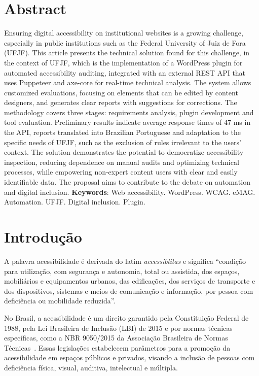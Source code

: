 \documentclass[
    12pt,
    a4paper,
    oneside,
    brazil,
    english
]{article}
\begin{document}
\section*{Abstract}
Ensuring digital accessibility on institutional websites is a growing challenge, especially
in public institutions such as the Federal University of Juiz de Fora (UFJF). This article
presents the technical solution found for this challenge, in the context of UFJF, which is the
implementation of a WordPress plugin for automated accessibility auditing, integrated with
an external REST API that uses Puppeteer and axe-core for real-time technical analysis. The
system allows customized evaluations, focusing on elements that can be edited by content
designers, and generates clear reports with suggestions for corrections. The methodology covers
three stages: requirements analysis, plugin development and tool evaluation. Preliminary results
indicate average response times of 47 ms in the API, reports translated into Brazilian Portuguese
and adaptation to the specific needs of UFJF, such as the exclusion of rules irrelevant to the
users' context. The solution demonstrates the potential to democratize accessibility inspection,
reducing dependence on manual audits and optimizing technical processes, while empowering
non-expert content users with clear and easily identifiable data. The proposal aims to contribute
to the debate on automation and digital inclusion.
\bigbreak
\noindent
\textbf{Keywords}: Web accessibility. WordPress. WCAG. eMAG. Automation. UFJF. Digital inclusion. Plugin.

\section*{Introdução}

A palavra acessibilidade é derivada do latim \textit{accessiblitas}
e significa ``condição para utilização, com segurança e autonomia,
total ou assistida, dos espaços, mobiliários e equipamentos urbanos, das
edificações, dos serviços de transporte e dos dispositivos, sistemas e meios de
comunicação e informação, por pessoa com deficiência ou mobilidade reduzida''\cite{CD}.

No Brasil, a acessibilidade é um direito garantido pela Constituição
Federal de 1988, pela Lei Brasileira de Inclusão (LBI) de 2015 \cite{LBI}
e por normas técnicas específicas, como a NBR 9050/2015 da Associação
Brasileira de Normas Técnicas~\cite{ABNT}. Essas legislações estabelecem
parâmetros para a promoção da acessibilidade em espaços públicos e privados,
visando a inclusão de pessoas com deficiência física, visual, auditiva,
intelectual e múltipla.
\end{document}
